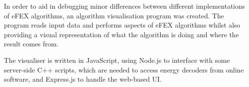 In order to aid in debugging minor differences between different implementations
of \ac{eFEX} algorithms, an algorithm visualisation program was created.
%
The program reads input data and performs aspects of \ac{eFEX} algorithms whilst
also providing a visual representation of what the algorithm is doing and where
the result comes from.

The visualiser is written in JavaScript, using Node.js \cite{nodejs} to
interface with some server-side C++ scripts, which are needed to access energy
decoders from online software, and Express.js \cite{expressjs} to handle the
web-based \ac{UI}.

